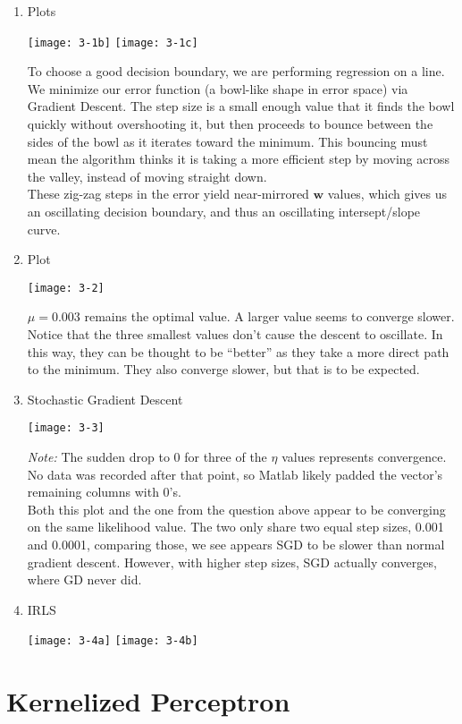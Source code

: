 \documentclass{article}
\begin{document}
\begin{enumerate}
\item Plots
  \begin{center}
  \texttt{[image: 3-1b]}
  \texttt{[image: 3-1c]}
\end{center}

  To choose a good decision boundary, we are performing regression on a line.
  We minimize our error function (a bowl-like shape in error space) via
  Gradient Descent. The step size is a small enough value that it finds the
  bowl quickly without overshooting it, but then proceeds to bounce between
  the sides of the bowl as it iterates toward the minimum. This bouncing
  must mean the algorithm thinks it is taking a more efficient step
  by moving across the valley, instead of moving straight down.\\

  These zig-zag steps in the error yield near-mirrored $\mathbf{w}$ values,
  which gives us an oscillating decision boundary, and thus an
  oscillating intersept/slope curve.
  
\item Plot
  \begin{center}
    \texttt{[image: 3-2]}
  \end{center}

  $\mu = 0.003$ remains the optimal value. A larger value seems to
  converge slower.\\
  Notice that the three smallest values don't cause the descent to oscillate.
  In this way, they can be thought to be ``better'' as they take a more
  direct path to the minimum.
  They also converge slower, but that is to be expected.

\item Stochastic Gradient Descent
  \begin{center}
    \texttt{[image: 3-3]}
  \end{center}

  \emph{Note:} The sudden drop to 0 for three of the $\eta$ values
  represents convergence. No data was recorded after that point, so
  Matlab likely padded the vector's remaining columns with 0's.\\
  
  Both this plot and the one from the question above appear to be
  converging on the same likelihood value. The two only share two equal
  step sizes, 0.001 and 0.0001, comparing those, we see appears SGD to be
  slower than normal gradient descent. However, with higher step sizes,
  SGD actually converges, where GD never did.

\item IRLS
  \begin{center}
  \texttt{[image: 3-4a]}
  \texttt{[image: 3-4b]}
\end{center}
\end{enumerate}

\section{Kernelized Perceptron}
\end{document}
